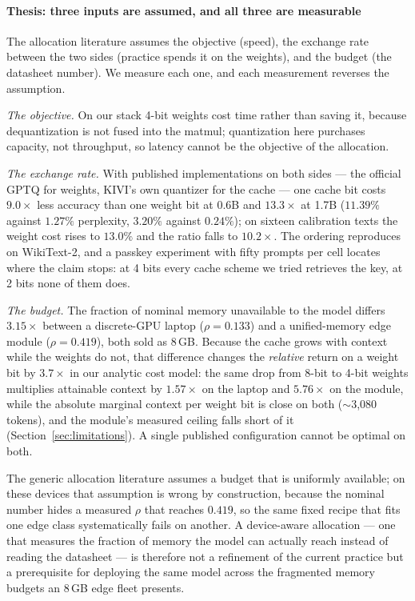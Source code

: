 \documentclass[10pt,journal]{IEEEtran}
\newcommand{\rhoSym}{\rho}
\begin{document}
\paragraph*{Thesis: three inputs are assumed, and all three are measurable}
The allocation literature assumes the objective (speed), the exchange rate
between the two sides (practice spends it on the weights), and the budget (the
datasheet number). We measure each one, and each measurement reverses the
assumption.

\emph{The objective.} On our stack 4-bit weights cost time rather than saving it,
because dequantization is not fused into the matmul; quantization here purchases
capacity, not throughput, so latency cannot be the objective of the allocation.

\emph{The exchange rate.} With published implementations on both sides --- the
official GPTQ for weights, KIVI's own quantizer for the cache --- one cache bit
costs $9.0\times$ less accuracy than one weight bit at 0.6B and $13.3\times$ at
1.7B ($11.39\%$ against $1.27\%$ perplexity, $3.20\%$ against
$0.24\%$); on sixteen calibration texts the weight cost rises to $13.0\%$ and
the ratio falls to $10.2\times$. The
ordering reproduces on WikiText-2, and a passkey experiment with fifty prompts
per cell locates where the claim stops: at 4 bits every cache scheme we tried
retrieves the key, at 2 bits none of them does.

\emph{The budget.} The fraction of nominal memory unavailable to the
model differs $3.15\times$ between a discrete-GPU laptop ($\rhoSym=0.133$) and a
unified-memory edge module ($\rhoSym=0.419$), both sold as 8\,GB. Because the
cache grows with context while the weights do not, that difference changes the
\emph{relative} return on a weight bit by $3.7\times$ in our analytic cost model:
the same drop from 8-bit to 4-bit weights multiplies attainable context by
$1.57\times$ on the laptop and $5.76\times$ on the module, while the absolute
marginal context per weight bit is close on both ($\sim$3{,}080 tokens), and the
module's measured ceiling
falls short of it (Section~\ref{sec:limitations}). A single published configuration cannot be optimal
on both.

The generic allocation literature assumes a budget that is uniformly available;
on these devices that assumption is wrong by construction, because the nominal
number hides a measured $\rhoSym$ that reaches $0.419$, so the same fixed recipe
that fits one edge class systematically fails on another. A device-aware
allocation --- one that measures the fraction of memory the model can actually
reach instead of reading the datasheet --- is therefore not a refinement of the
current practice but a prerequisite for deploying the same model across the
fragmented memory budgets an 8\,GB edge fleet presents.
\end{document}
